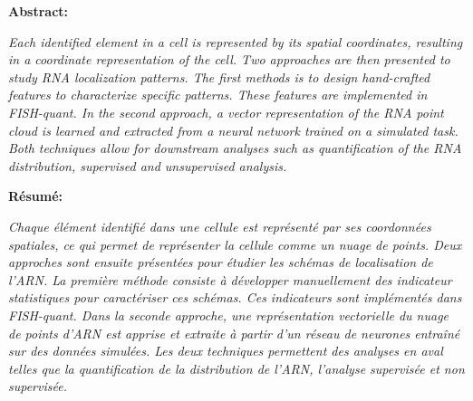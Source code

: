 
\textbf{Abstract:}
\hspace{0.5cm}

\textit{
Each identified element in a cell is represented by its spatial coordinates, resulting in a coordinate representation of the cell.
Two approaches are then presented to study RNA localization patterns.
The first methods is to design hand-crafted features to characterize specific patterns.
These features are implemented in FISH-quant.
In the second approach, a vector representation of the RNA point cloud is learned and extracted from a neural network trained on a simulated task.
Both techniques allow for downstream analyses such as quantification of the RNA distribution, supervised and unsupervised analysis.
}

\vspace{0.5cm}

\noindent
\textbf{Résumé:}
\hspace{0.5cm}

\textit{
Chaque élément identifié dans une cellule est représenté par ses coordonnées spatiales, ce qui permet de représenter la cellule comme un nuage de points.
Deux approches sont ensuite présentées pour étudier les schémas de localisation de l'ARN.
La première méthode consiste à développer manuellement des indicateur statistiques pour caractériser ces schémas.
Ces indicateurs sont implémentés dans FISH-quant.
Dans la seconde approche, une représentation vectorielle du nuage de points d'ARN est apprise et extraite à partir d'un réseau de neurones entraîné sur des données simulées.
Les deux techniques permettent des analyses en aval telles que la quantification de la distribution de l'ARN, l'analyse supervisée et non supervisée.
}
